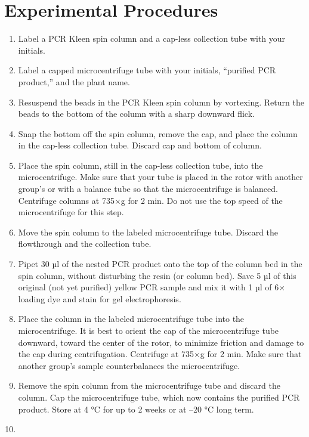 \documentclass[]{book}
\providecommand{\tightlist}{%
  \setlength{\itemsep}{0pt}\setlength{\parskip}{0pt}}
\theoremstyle{definition}
\theoremstyle{definition}
\theoremstyle{definition}
\theoremstyle{remark}
\begin{document}
\section{Experimental Procedures}\label{experimental-procedures-12}

\begin{enumerate}
\def\labelenumi{\arabic{enumi}.}
\tightlist
\item
  Label a PCR Kleen spin column and a cap-less collection tube with your
  initials.
\item
  Label a capped microcentrifuge tube with your initials, ``purified PCR
  product,'' and the plant name.
\item
  Resuspend the beads in the PCR Kleen spin column by vortexing. Return
  the beads to the bottom of the column with a sharp downward flick.
\item
  Snap the bottom off the spin column, remove the cap, and place the
  column in the cap-less collection tube. Discard cap and bottom of
  column.
\item
  Place the spin column, still in the cap-less collection tube, into the
  microcentrifuge. Make sure that your tube is placed in the rotor with
  another group's or with a balance tube so that the microcentrifuge is
  balanced. Centrifuge columns at 735×g for 2 min. Do not use the top
  speed of the microcentrifuge for this step.
\item
  Move the spin column to the labeled microcentrifuge tube. Discard the
  flowthrough and the collection tube.
\item
  Pipet 30 µl of the nested PCR product onto the top of the column bed
  in the spin column, without disturbing the resin (or column bed). Save
  5 µl of this original (not yet purified) yellow PCR sample and mix it
  with 1 µl of 6× loading dye and stain for gel electrophoresis.
\item
  Place the column in the labeled microcentrifuge tube into the
  microcentrifuge. It is best to orient the cap of the microcentrifuge
  tube downward, toward the center of the rotor, to minimize friction
  and damage to the cap during centrifugation. Centrifuge at 735×g for 2
  min. Make sure that another group's sample counterbalances the
  microcentrifuge.
\item
  Remove the spin column from the microcentrifuge tube and discard the
  column. Cap the microcentrifuge tube, which now contains the purified
  PCR product. Store at 4 °C for up to 2 weeks or at --20 °C long term.
\item

\end{enumerate}
\end{document}
